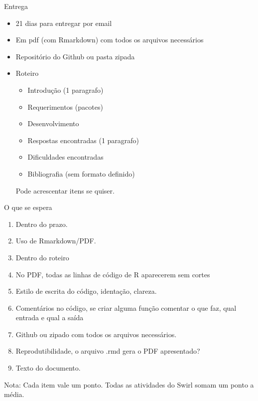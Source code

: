 \documentclass[handout]{beamer}
\begin{document}
\begin{frame}{Entrega}
  \begin{itemize}
  \item 21 dias para entregar por email
  \item Em pdf (com Rmarkdown) com todos os arquivos necessários
   
  \item Repositório do Github ou pasta zipada

  \item Roteiro
    \begin{itemize}
      
    \item Introdução (1 paragrafo)
    \item Requerimentos (pacotes)
      
    \item Desenvolvimento
    \item Respostas encontradas (1 paragrafo)
      
    \item Dificuldades encontradas
      
    \item Bibliografia (sem formato definido)
    \end{itemize}
    Pode acrescentar itens se quiser.
    \end{itemize}
  \end{frame}

  \begin{frame}{O que se espera}
    \begin{enumerate}
    \item  Dentro do prazo.
    \item Uso de Rmarkdown/PDF.
    \item Dentro do roteiro
      
    \item No PDF, todas as linhas de código de R aparecerem sem cortes
    \item Estilo de escrita do código, identação, clareza.
      
    \item Comentários no código, se criar alguma função comentar o que faz, qual entrada e qual a saída
    \item Github ou zipado com todos os arquivos necessários.
      
    \item Reprodutibilidade, o arquivo .rmd gera o PDF apresentado?
      
    \item Texto do documento.
      
    \end{enumerate}

    Nota: Cada item vale um ponto. Todas as atividades do Swirl somam um ponto a média. 
  \end{frame}
  
\end{document}
